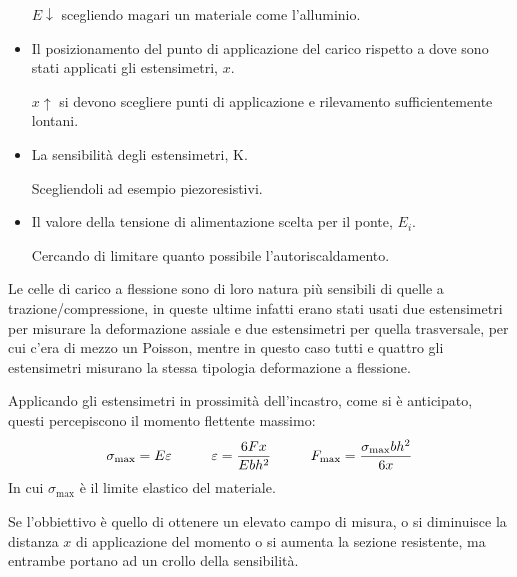 \documentclass[a4paper, 15pt]{article}
\begin{document}
\begin{adjustwidth}{2in}{}
\begin{itemize}
	 		$E\downarrow$ scegliendo magari un materiale come l'alluminio. 
	 		
	 		\item Il posizionamento del punto di applicazione del carico rispetto a dove sono
	 		stati applicati gli estensimetri, $x$. 
	 		
	 		$x\uparrow$ si devono scegliere punti di applicazione e rilevamento sufficientemente lontani. 
	 		
	 		\item La sensibilità degli estensimetri, K. 
	 		
	 		Scegliendoli ad esempio piezoresistivi. 
	 		
	 		\item Il valore della tensione di alimentazione scelta per il ponte, $E_i$. 
	 		
	 		Cercando di limitare quanto possibile l'autoriscaldamento. 
	 	\end{itemize}		
 		Le celle di carico a flessione sono di loro natura più sensibili di quelle a trazione/compressione, in queste ultime infatti erano stati usati due estensimetri per misurare la deformazione assiale e due estensimetri per quella trasversale, per cui c'era di mezzo un Poisson, mentre in questo caso tutti e quattro gli estensimetri misurano la stessa tipologia deformazione a flessione. 
 	
 		Applicando gli estensimetri in prossimità dell'incastro, come si è anticipato, questi percepiscono il momento flettente massimo:
 		\[\sigma_{\text{max}} = E\varepsilon \hspace{1cm} \varepsilon={6Fx\over Ebh^2} \hspace{1cm} F_{\text{max}} = {\sigma_{\text{max}}bh^2\over6x}\]
 		In cui $ \sigma_{\text{max}} $ è il limite elastico del materiale.\newline 

 		Se l'obbiettivo è quello di ottenere un elevato campo di misura, o si diminuisce la distanza $x$ di applicazione del momento o si aumenta la sezione resistente, ma entrambe portano ad un crollo della sensibilità.  
 		

\end{adjustwidth}
\end{document}
